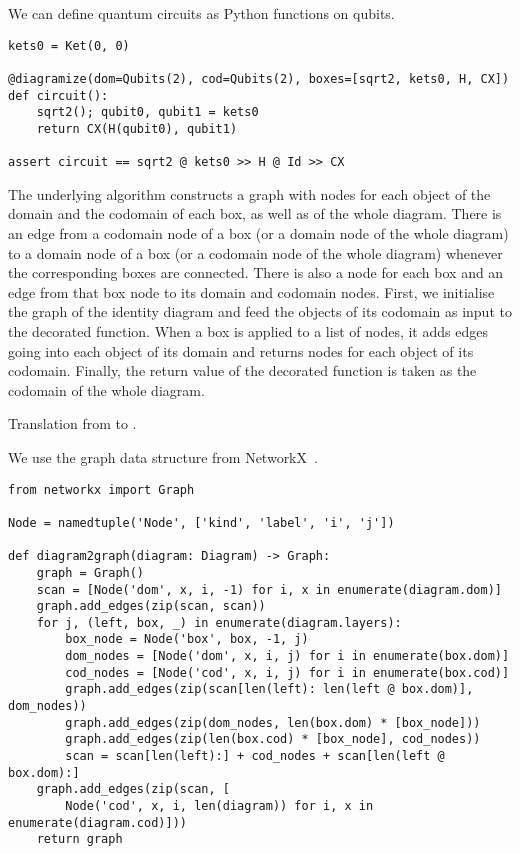\begin{example}
We can define quantum circuits as Python functions on qubits.

\begin{verbatim}
kets0 = Ket(0, 0)

@diagramize(dom=Qubits(2), cod=Qubits(2), boxes=[sqrt2, kets0, H, CX])
def circuit():
    sqrt2(); qubit0, qubit1 = kets0
    return CX(H(qubit0), qubit1)

assert circuit == sqrt2 @ kets0 >> H @ Id >> CX
\end{verbatim}
\end{example}

The underlying algorithm constructs a graph with nodes for each object of the domain and the codomain of each box, as well as of the whole diagram.
There is an edge from a codomain node of a box (or a domain node of the whole diagram) to a domain node of a box (or a codomain node of the whole diagram) whenever the corresponding boxes are connected.
There is also a node for each box and an edge from that box node to its domain and codomain nodes.
First, we initialise the graph of the identity diagram and feed the objects of its codomain as input to the decorated function.
When a box is applied to a list of nodes, it adds edges going into each object of its domain and returns nodes for each object of its codomain.
Finally, the return value of the decorated function is taken as the codomain of the whole diagram.

\begin{python}\label{listing:diagram2graph}
{\normalfont Translation from  to .}

We use the graph data structure from NetworkX~\cite{HagbergEtAl08}.

\begin{verbatim}
from networkx import Graph

Node = namedtuple('Node', ['kind', 'label', 'i', 'j'])

def diagram2graph(diagram: Diagram) -> Graph:
    graph = Graph()
    scan = [Node('dom', x, i, -1) for i, x in enumerate(diagram.dom)]
    graph.add_edges(zip(scan, scan))
    for j, (left, box, _) in enumerate(diagram.layers):
        box_node = Node('box', box, -1, j)
        dom_nodes = [Node('dom', x, i, j) for i in enumerate(box.dom)]
        cod_nodes = [Node('cod', x, i, j) for i in enumerate(box.cod)]
        graph.add_edges(zip(scan[len(left): len(left @ box.dom)], dom_nodes))
        graph.add_edges(zip(dom_nodes, len(box.dom) * [box_node]))
        graph.add_edges(zip(len(box.cod) * [box_node], cod_nodes))
        scan = scan[len(left):] + cod_nodes + scan[len(left @ box.dom):]
    graph.add_edges(zip(scan, [
        Node('cod', x, i, len(diagram)) for i, x in enumerate(diagram.cod)]))
    return graph
\end{verbatim}
\end{python}

